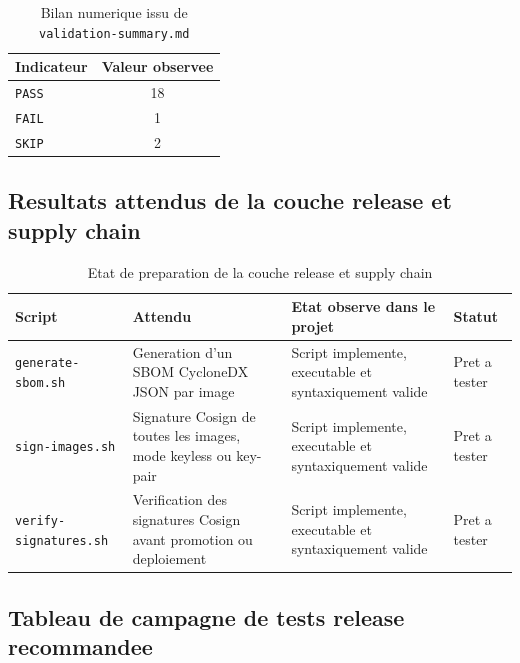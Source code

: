 \begin{table}[h]
\centering
\begin{tabular}{|l|c|}
\hline
\textbf{Indicateur} & \textbf{Valeur observee} \\
\hline
\texttt{PASS} & 18 \\
\hline
\texttt{FAIL} & 1 \\
\hline
\texttt{SKIP} & 2 \\
\hline
\end{tabular}
\caption{Bilan numerique issu de \texttt{validation-summary.md}}
\end{table}

\subsection{Resultats attendus de la couche release et supply chain}

\begin{table}[h]
\centering
\begin{tabular}{|p{3.9cm}|p{3.7cm}|p{4.5cm}|p{2.5cm}|}
\hline
\textbf{Script} & \textbf{Attendu} & \textbf{Etat observe dans le projet} & \textbf{Statut} \\
\hline
\texttt{generate-sbom.sh} & Generation d'un SBOM CycloneDX JSON par image & Script implemente, executable et syntaxiquement valide & Pret a tester \\
\hline
\texttt{sign-images.sh} & Signature Cosign de toutes les images, mode keyless ou key-pair & Script implemente, executable et syntaxiquement valide & Pret a tester \\
\hline
\texttt{verify-signatures.sh} & Verification des signatures Cosign avant promotion ou deploiement & Script implemente, executable et syntaxiquement valide & Pret a tester \\
\hline
\end{tabular}
\caption{Etat de preparation de la couche release et supply chain}
\end{table}

\subsection{Tableau de campagne de tests release recommandee}

